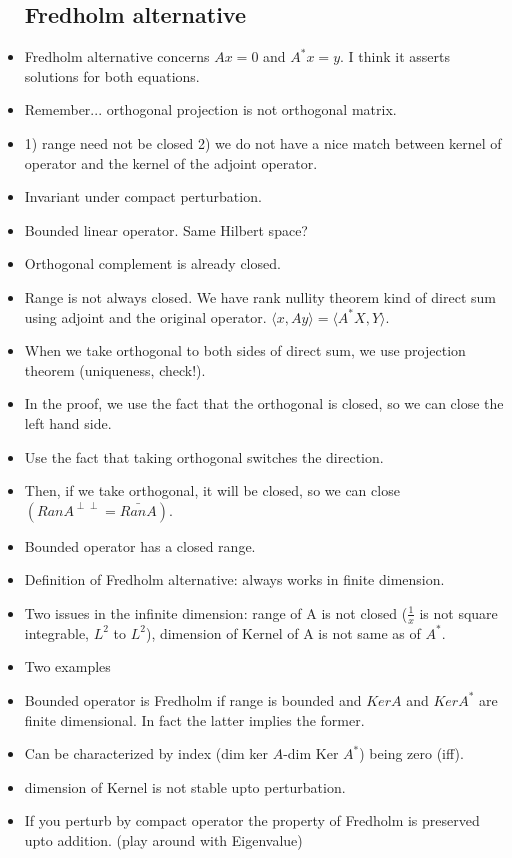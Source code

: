 \documentclass{article}
\theoremstyle{remark}
\begin{document}
\begin{itemize}
\subsection*{Fredholm alternative}
\item Fredholm alternative concerns $Ax=0$ and $A^*x=y$. I think it asserts solutions for both equations.
\item Remember... orthogonal projection is not orthogonal matrix.
\item 1) range need not be closed 2) we do not have a nice match between kernel of operator and the kernel of the adjoint operator.
\item Invariant under compact perturbation.




\item Bounded linear operator. Same Hilbert space?
\item Orthogonal complement is already closed.
\item Range is not always closed. We have rank nullity theorem kind of direct sum using adjoint and the original operator. $\langle x,Ay\rangle=\langle A^*X,Y\rangle$.
\item When we take orthogonal to both sides of direct sum, we use projection theorem (uniqueness, check!).
\item In the proof, we use the fact that the orthogonal is closed, so we can close the left hand side.
\item Use the fact that taking orthogonal switches the direction.
\item Then, if we take orthogonal, it will be closed, so we can close $(Ran A^{\perp\perp}=\bar{Ran A})$.
\item Bounded operator has a closed range.
\item Definition of Fredholm alternative: always works in finite dimension.
\item Two issues in the infinite dimension: range of A is not closed ($\frac 1x$ is not square integrable, $L^2$ to $L^2$), dimension of Kernel of A is not same as of $A^*$.
\item Two examples
\item Bounded operator is Fredholm if range is bounded and $Ker A$ and $Ker A^*$ are finite dimensional. In fact the latter implies the former.
\item Can be characterized by index (dim ker $A$-dim Ker $A^*$) being zero (iff).
\item dimension of Kernel is not stable upto perturbation.
\item If you perturb by compact operator the property of Fredholm is preserved upto addition. (play around with Eigenvalue)

\end{itemize}
\end{document}
